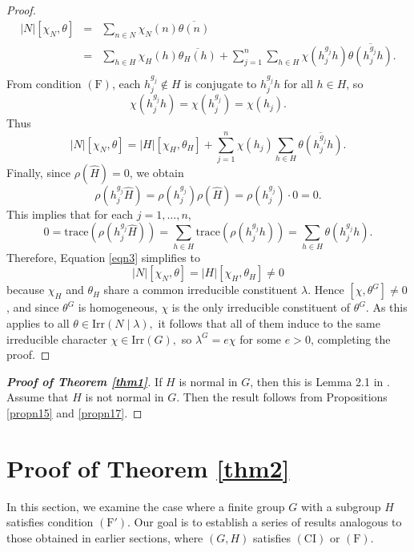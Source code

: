 \documentclass[twoside,a4paper,reqno,11pt]{amsart}
\newcommand{\<}{\langle}
\renewcommand{\>}{\rangle}
\newcommand{\Irr}{\mathrm {Irr}}
\newcommand{\F}{\mathrm{(F)}}
\newcommand{\CI}{\mathrm{(CI)}}
\newcommand{\Fp}{\mathrm{(F')}}
\renewcommand{\:}{\colon}
\theoremstyle{definition}
\begin{document}
\begin{proof}
	$$\begin{array}{lll}
		|N|[\chi_N,\theta] &=& \sum_{n\in N}\chi_N(n)\overline{\theta(n)}\\
		& =&  \sum_{h\in H}\chi_H(h)\overline{\theta_H(h)} +\sum_{j=1}^n \sum_{h\in H}\chi(h_j^{g_j}h)\overline{\theta(h_j^{g_j}h)}. \\
		\end{array} $$
	From condition $\F$, each  $h_j^{g_j}\notin H$ is conjugate to $h_j^{g_j}h$ for all $h\in H$, so $$\chi(h_j^{g_j}h) = \chi(h_j^{g_j}) = \chi(h_j).$$ Thus
\begin{equation}\label{eqn3}
|N|[\chi_N,\theta]= |H|[\chi_H,\theta_H]  +\sum_{j=1}^n \chi(h_j)\sum_{h\in H} \overline{\theta(h_j^{g_j}h)} .
\end{equation}
Finally, since $\rho(\widehat{H})=0$, we obtain
\[\rho(h_j^{g_j}\widehat{H}) = \rho(h_j^{g_j})\rho(\widehat{H}) = \rho(h_j^{g_j})\cdot 0 = 0.\]
This implies that for each $j=1,\ldots,n$, $$0=\mathrm{trace}\left(\rho(h_j^{g_j}\widehat{H})\right) =\sum_{h\in H}\mathrm{trace}\left(\rho(h_j^{g_j}h)\right) = \sum_{h\in H}\theta(h_j^{g_j}h).$$  Therefore, Equation \eqref{eqn3} simplifies to $$|N|[\chi_N,\theta] = |H|[\chi_H,\theta_H]\neq 0$$  because $\chi_H$ and $\theta_H$ share a common irreducible constituent $\lambda$. 
Hence $[\chi,\theta^G]\neq 0$, and since $\theta^G$ is homogeneous, $\chi$ is the only irreducible constituent of $\theta^G.$ As this applies to all $\theta\in\Irr(N\mid \lambda),$ it follows that all of them induce to the same irreducible character $\chi\in\Irr(G),$ so $\lambda^G=e\chi$ for some $e>0$, completing the proof.
\end{proof}

\begin{proof}[\textbf{Proof of Theorem \ref{thm1}}]
If $H$ is normal in $G$, then this is Lemma 2.1 in \cite{Kuisch-vanderWaall}. Assume that $H$ is not normal in $G$. Then the result follows from Propositions \ref{propn15} and \ref{propn17}. 
\end{proof}
\section{Proof of Theorem \ref{thm2}}

In this section, we examine the case where a finite group $G$ with a subgroup $H$ satisfies condition $\Fp$.   Our goal is to establish a series of results analogous to those obtained in earlier sections, where $(G,H)$ satisfies $\CI$ or $\F$.  
\end{document}
